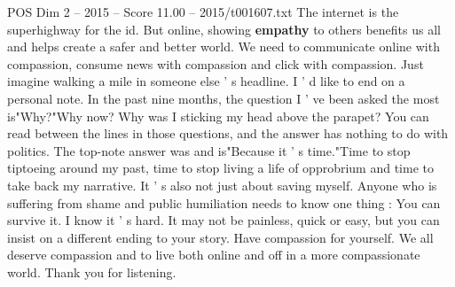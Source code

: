 \begin{textsample}{POS Dim 2 – 2015 – Score 11.00 – 2015/t001607.txt}
The internet is the superhighway for the id.
But online, showing \textbf{empathy} to others benefits us all and helps create a safer and better world.
We need to communicate online with compassion, consume news with compassion and click with compassion.
Just imagine walking a mile in someone else ' s headline.
I ' d like to end on a personal note.
In the past nine months, the question I ' ve been asked the most is"Why?"Why now?
Why was I sticking my head above the parapet?
You can read between the lines in those questions, and the answer has nothing to do with politics.
The top-note answer was and is"Because it ' s time."Time to stop tiptoeing around my past, time to stop living a life of opprobrium and time to take back my narrative.
It ' s also not just about saving myself.
Anyone who is suffering from shame and public humiliation needs to know one thing : You can survive it.
I know it ' s hard.
It may not be painless, quick or easy, but you can insist on a different ending to your story.
Have compassion for yourself.
We all deserve compassion and to live both online and off in a more compassionate world.
Thank you for listening.

\end{textsample}
